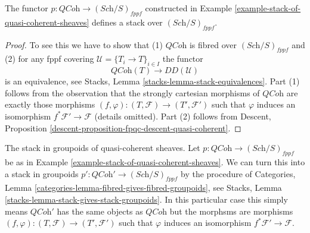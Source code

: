 \begin{lemma}
\label{lemma-stack-of-quasi-coherent-sheaves}
The functor $p : \textit{QCoh} \to (\textit{Sch}/S)_{fppf}$
constructed in Example \ref{example-stack-of-quasi-coherent-sheaves}
defines a stack over $(\textit{Sch}/S)_{fppf}$.
\end{lemma}

\begin{proof}
To see this we have to show that (1) $\textit{QCoh}$ is fibred over
$(\textit{Sch}/S)_{fppf}$ and (2) for any fppf covering
$\mathcal{U} = \{T_i \to T\}_{i \in I}$ the functor
$$
\textit{QCoh}(T) \longrightarrow DD(\mathcal{U})
$$
is an equivalence, see
Stacks, Lemma \ref{stacks-lemma-stack-equivalences}.
Part (1) follows from the observation that the strongly cartesian morphisms
of $\textit{QCoh}$ are exactly those morphisms
$(f, \varphi) : (T, \mathcal{F}) \to (T', \mathcal{F}')$
such that $\varphi$ induces an isomorphism
$f^*\mathcal{F}' \to \mathcal{F}$ (details omitted).
Part (2) follows from
Descent, Proposition \ref{descent-proposition-fpqc-descent-quasi-coherent}.
\end{proof}

\begin{example}
\label{example-stack-in-groupoids-of-quasi-coherent-sheaves}
The stack in groupoids of quasi-coherent sheaves.
Let $p : \textit{QCoh} \to (\textit{Sch}/S)_{fppf}$ be as in
Example \ref{example-stack-of-quasi-coherent-sheaves}.
We can turn this into a stack in groupoids
$p' : \textit{QCoh}' \to (\textit{Sch}/S)_{fppf}$ by
the procedure of
Categories, Lemma \ref{categories-lemma-fibred-gives-fibred-groupoids},
see
Stacks, Lemma \ref{stacks-lemma-stack-gives-stack-groupoids}.
In this particular case this simply means $\textit{QCoh}'$ has
the same objects as $\textit{QCoh}$ but the morphsms are
morphisms $(f, \varphi) : (T, \mathcal{F}) \to (T', \mathcal{F}')$
such that $\varphi$ induces an isomorphism $f^*\mathcal{F}' \to \mathcal{F}$.
\end{example}





















































